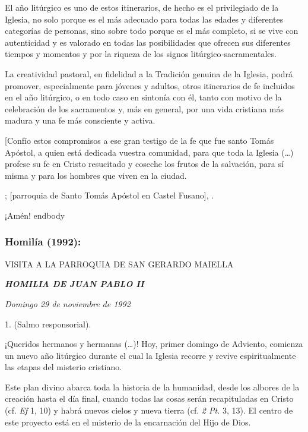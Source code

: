 \begin{body}
	El año litúrgico es uno de estos itinerarios, de hecho es el privilegiado de la Iglesia, no solo porque es el más adecuado para todas las edades y diferentes categorías de personas, sino sobre todo porque es el más completo, si se vive con autenticidad y es valorado en todas las posibilidades que ofrecen sus diferentes tiempos y momentos y por la riqueza de los signos litúrgico\emph{-}sacramentales.
	
	La creatividad pastoral, en fidelidad a la Tradición genuina de la Iglesia, podrá promover, especialmente para jóvenes y adultos, otros itinerarios de fe incluidos en el año litúrgico, o en todo caso en sintonía con él, tanto con motivo de la celebración de los sacramentos y, más en general, por una vida cristiana más madura y una fe más consciente y activa.
	
	{[}Confío estos compromisos a ese gran testigo de la fe que fue santo Tomás Apóstol, a quien está dedicada vuestra comunidad, para que toda la Iglesia (\ldots{}) profese su fe en Cristo resucitado y coseche los frutos de la salvación, para sí misma y para los hombres que viven en la ciudad.
	
	; {[}parroquia de Santo Tomás Apóstol en Castel Fusano{]}, .
	
	¡Amén!
	end{body}
	
	\subsubsection{Homilía (1992):}
	
	VISITA A LA PARROQUIA DE SAN GERARDO MAIELLA
	
	\emph{\textbf{HOMILIA DE JUAN PABLO II}}
	
	\emph{Domingo 29 de noviembre de 1992}
	
	\begin{body}
		1.  (Salmo responsorial).
		
		¡Queridos hermanos y hermanas (\ldots{})! Hoy, primer domingo de Adviento, comienza un nuevo año litúrgico durante el cual la Iglesia recorre y revive espiritualmente las etapas del misterio cristiano.
		
		Este plan divino abarca toda la historia de la humanidad, desde los albores de la creación hasta el día final, cuando todas las cosas serán recapituladas en Cristo (cf. \emph{Ef} 1, 10) y habrá nuevos cielos y nueva tierra (cf. \emph{2 Pt.} 3, 13). El centro de este proyecto está en el misterio de la encarnación del Hijo de Dios.
		

\end{body}
\end{body}
